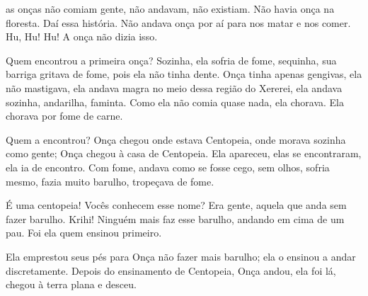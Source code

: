  

 as onças não comiam gente, não andavam, não existiam. Não
havia onça na floresta. Daí essa história. Não andava onça por aí para nos
matar e nos comer. Hu, Hu! Hu! A onça não dizia isso. 

Quem encontrou a primeira onça? Sozinha, ela sofria de fome, sequinha,
sua barriga gritava de fome, pois ela não tinha dente. Onça tinha apenas
gengivas, ela não mastigava, ela andava magra no meio dessa região do
Xererei, ela andava sozinha, andarilha, faminta. Como ela não comia quase
nada, ela chorava. Ela chorava por fome de carne. 

Quem a encontrou? Onça chegou onde estava Centopeia, onde morava
sozinha como gente; Onça chegou à casa de Centopeia. Ela apareceu, elas
se encontraram, ela ia de encontro. Com fome, andava como se fosse cego,
sem olhos, sofria mesmo, fazia muito barulho, tropeçava de fome. 

É uma centopeia! Vocês conhecem esse nome? Era gente, aquela que anda
sem fazer barulho. Krihi! Ninguém mais faz esse barulho, andando em cima de um pau.
Foi ela quem ensinou primeiro. 

Ela emprestou seus pés para Onça não fazer mais barulho; ela o ensinou a
andar discretamente. Depois do ensinamento de Centopeia, Onça andou, ela
foi lá, chegou à terra plana e desceu.

 
